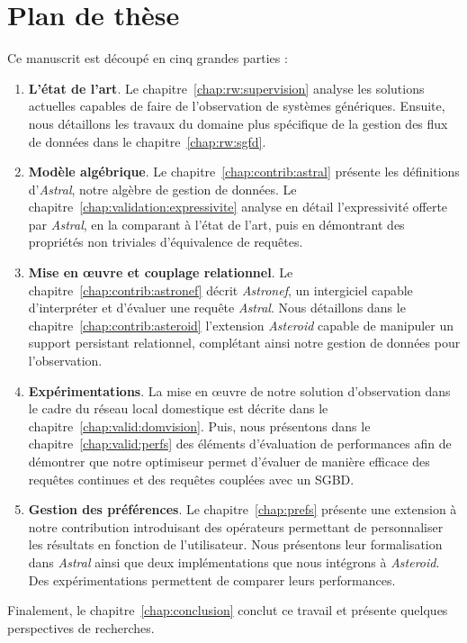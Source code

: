 \section{Plan de thèse}\label{sec:intro:plan}
Ce manuscrit est découpé en cinq grandes parties :
\begin{enumerate}
\item \textbf{L'état de l'art}. Le chapitre~\ref{chap:rw:supervision} analyse les solutions actuelles capables de faire de l'observation de systèmes génériques. Ensuite, nous détaillons les travaux du domaine plus spécifique de la gestion des flux de données dans le chapitre~\ref{chap:rw:sgfd}.
\item \textbf{Modèle algébrique}. Le chapitre~\ref{chap:contrib:astral} présente les définitions d'\textit{Astral}, notre algèbre de gestion de données. Le chapitre~\ref{chap:validation:expressivite} analyse en détail l'expressivité offerte par \textit{Astral}, en la comparant à l'état de l'art, puis en démontrant des propriétés non triviales d'équivalence de requêtes. 
\item \textbf{Mise en œuvre et couplage relationnel}. Le chapitre~\ref{chap:contrib:astronef} décrit \textit{Astronef}, un intergiciel capable d'interpréter et d'évaluer une requête \textit{Astral}. Nous détaillons dans le chapitre~\ref{chap:contrib:asteroid} l'extension \textit{Asteroid} capable de manipuler un support persistant relationnel, complétant ainsi notre gestion de données pour l'observation.
\item \textbf{Expérimentations}. La mise en œuvre de notre solution d'observation dans le cadre du réseau local domestique est décrite dans le chapitre~\ref{chap:valid:domvision}. Puis, nous présentons dans le chapitre~\ref{chap:valid:perfs} des éléments d'évaluation de performances afin de démontrer que notre optimiseur permet d'évaluer de manière efficace des requêtes continues et des requêtes couplées avec un SGBD.
\item \textbf{Gestion des préférences}. Le chapitre~\ref{chap:prefs} présente une extension à notre contribution introduisant des opérateurs permettant de personnaliser les résultats en fonction de l'utilisateur. Nous présentons leur formalisation dans \textit{Astral} ainsi que deux implémentations que nous intégrons à \textit{Asteroid}. Des expérimentations permettent de comparer leurs performances.
\end{enumerate}

Finalement, le chapitre~\ref{chap:conclusion} conclut ce travail et présente quelques perspectives de recherches.